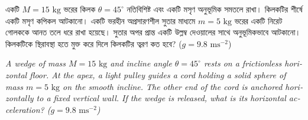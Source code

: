 \documentclass[12pt, a4paper]{article}
\begin{document}
\begin{tcolorbox}[questionbox={প্রশ্ন (Question) 9}]
\noindent
একটি $M = 15\text{ kg}$ ভরের কিলক $\theta = 45^\circ$ নতিবিশিষ্ট এবং একটি মসৃণ অনুভূমিক সমতলে রাখা। কিলকটির শীর্ষে একটি মসৃণ কপিকল আটকানো। একটি ভরহীন অপ্রসারণশীল সুতার মাধ্যমে $m = 5\text{ kg}$ ভরের একটি নিরেট গোলককে আনত তলে ধরে রাখা হয়েছে। সুতার অপর প্রান্ত একটি উল্লম্ব দেওয়ালের সাথে অনুভূমিকভাবে আটকানো। কিলকটিকে স্থিরাবস্থা হতে মুক্ত করে দিলে কিলকটির ত্বরণ কত হবে? ($g = 9.8\text{ ms}^{-2}$)

\vspace{0.8em}
\begin{english}
\noindent\textit{\color{darkgray}
A wedge of mass $M = 15\text{ kg}$ and incline angle $\theta = 45^\circ$ rests on a frictionless horizontal floor. At the apex, a light pulley guides a cord holding a solid sphere of mass $m = 5\text{ kg}$ on the smooth incline. The other end of the cord is anchored horizontally to a fixed vertical wall. If the wedge is released, what is its horizontal acceleration? ($g = 9.8\text{ ms}^{-2}$)
}
\end{english}
\end{tcolorbox}
\end{document}

